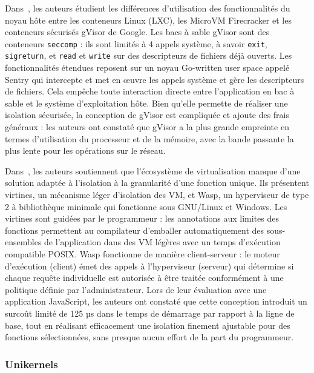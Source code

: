 Dans~\cite{Anjali2020BlendingCA}, les auteurs étudient les différences d'utilisation des fonctionnalités du noyau hôte entre les conteneurs Linux (LXC), les MicroVM Firecracker et les conteneurs sécurisés gVisor de Google. Les bacs à sable gVisor sont des conteneurs \texttt{seccomp} : ils sont limités à 4 appels système, à savoir \texttt{exit}, \texttt{sigreturn}, et \texttt{read} et \texttt{write} sur des descripteurs de fichiers déjà ouverts. Les fonctionnalités étendues reposent sur un noyau Go-written user space appelé Sentry qui intercepte et met en œuvre les appels système et gère les descripteurs de fichiers. Cela empêche toute interaction directe entre l'application en bac à sable et le système d'exploitation hôte. Bien qu'elle permette de réaliser une isolation sécurisée, la conception de gVisor est compliquée et ajoute des frais généraux : les auteurs ont constaté que gVisor a la plus grande empreinte en termes d'utilisation du processeur et de la mémoire, avec la bande passante la plus lente pour les opérations sur le réseau.

Dans~\cite{wanningerIsolatingFunctionsHardware2022a}, les auteurs soutiennent que l'écosystème de virtualisation manque d'une solution adaptée à l'isolation à la granularité d'une fonction unique. Ils présentent virtines, un mécanisme léger d'isolation des VM, et Wasp, un hyperviseur de type 2 à bibliothèque minimale qui fonctionne sous GNU/Linux et Windows. Les virtines sont guidées par le programmeur : les annotations aux limites des fonctions permettent au compilateur d'emballer automatiquement des sous-ensembles de l'application dans des VM légères avec un temps d'exécution compatible POSIX. Wasp fonctionne de manière client-serveur : le moteur d'exécution (client) émet des appels à l'hyperviseur (serveur) qui détermine si chaque requête individuelle est autorisée à être traitée conformément à une politique définie par l'administrateur. Lors de leur évaluation avec une application JavaScript, les auteurs ont constaté que cette conception introduit un surcoût limité de 125 µs dans le temps de démarrage par rapport à la ligne de base, tout en réalisant efficacement une isolation finement ajustable pour des fonctions sélectionnées, sans presque aucun effort de la part du programmeur.

\subsubsection{Unikernels}

